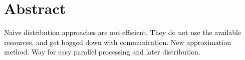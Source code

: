\section*{Abstract}
Naive distribution approaches are not efficient. They do not use the available resources, and get bogged down with communication.
New approximation method.
Way for easy parallel processing and later distribution.